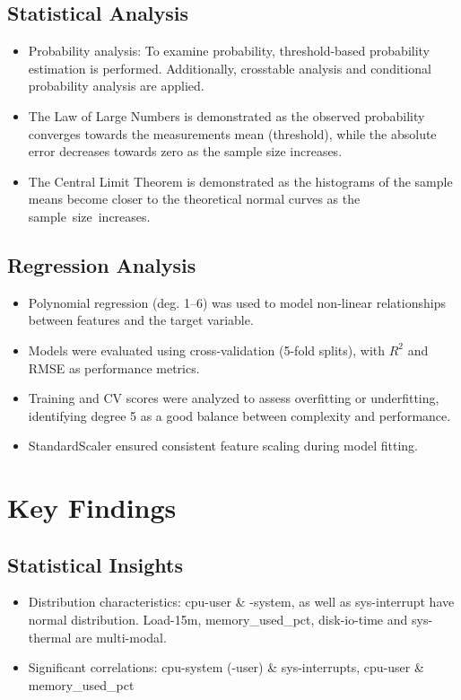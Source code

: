 \documentclass[11pt]{article}
\begin{document}
	\subsection{Statistical Analysis}
	\begin{itemize}
		\item Probability analysis: To examine probability, threshold-based probability estimation is performed. Additionally, crosstable analysis and conditional probability analysis are applied.
		\item The Law of Large Numbers is demonstrated as the observed probability converges towards the measurements mean (threshold), while the absolute error decreases towards zero as the sample size increases.
		
		\item The Central Limit Theorem is demonstrated as the histograms of the sample means become closer to the theoretical normal curves as the sample size increases.
		
		\end{itemize}
	
	\subsection{Regression Analysis}
	 \begin{itemize} 
	 	\item Polynomial regression (deg. 1–6) was used to model non-linear relationships between features and the target variable. 
	 	\item Models were evaluated using cross-validation (5-fold splits), with $R^2$ and RMSE as performance metrics. 
	 	\item Training and CV scores were analyzed to assess overfitting or underfitting, identifying degree 5 as a good balance between complexity and performance. 
	 	\item StandardScaler ensured consistent feature scaling during model fitting. 
	 	\end{itemize}
	
	\pagebreak
	\section{Key Findings}
	
	\subsection{Statistical Insights}
	
	\begin{itemize}
		\item Distribution characteristics: cpu-user \& -system, as well as sys-interrupt have normal distribution. Load-15m, memory\_used\_pct, disk-io-time and sys-thermal are multi-modal. 
		\item Significant correlations: cpu-system (-user) \& sys-interrupts, cpu-user \& memory\_used\_pct
		
	\end{itemize}
	
\end{document}
